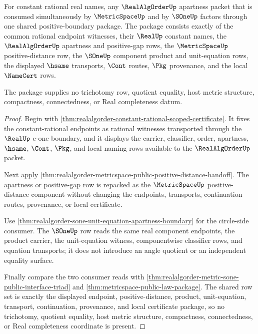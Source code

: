 \begin{theorem}
\label{thm:realalgorder-metricspace-sone-positive-boundary}
For constant rational real names, any $\RealAlgOrderUp$ apartness packet that is
consumed simultaneously by $\MetricSpaceUp$ and by $\SOneUp$ factors through one
shared positive-boundary package. The package consists exactly of the common
rational endpoint witnesses, their $\RealUp$ constant names, the
$\RealAlgOrderUp$ apartness and positive-gap rows, the $\MetricSpaceUp$
positive-distance row, the $\SOneUp$ component product and unit-equation rows,
the displayed $\hsame$ transports, $\Cont$ routes, $\Pkg$ provenance, and the
local $\NameCert$ rows.

The package supplies no trichotomy row, quotient equality, host metric
structure, compactness, connectedness, or Real completeness datum.
\end{theorem}
\begin{proof}
Begin with
\autoref{thm:realalgorder-constant-rational-scoped-certificate}. It fixes the
constant-rational endpoints as rational witnesses transported through the
$\RealUp$ e-one boundary, and it displays the carrier, classifier, order,
apartness, $\hsame$, $\Cont$, $\Pkg$, and local naming rows available to the
$\RealAlgOrderUp$ packet.

Next apply
\autoref{thm:realalgorder-metricspace-public-positive-distance-handoff}. The
apartness or positive-gap row is repacked as the $\MetricSpaceUp$
positive-distance component without changing the endpoints, transports,
continuation routes, provenance, or local certificate.

Use \autoref{thm:realalgorder-sone-unit-equation-apartness-boundary} for the
circle-side consumer. The $\SOneUp$ row reads the same real component endpoints,
the product carrier, the unit-equation witness, componentwise classifier rows,
and equation transports; it does not introduce an angle quotient or an
independent equality surface.

Finally compare the two consumer reads with
\autoref{thm:realalgorder-metric-sone-public-interface-triad} and
\autoref{thm:metricspace-public-law-package}. The shared row set is exactly the
displayed endpoint, positive-distance, product, unit-equation, transport,
continuation, provenance, and local certificate package, so no trichotomy,
quotient equality, host metric structure, compactness, connectedness, or Real
completeness coordinate is present.
\end{proof}

